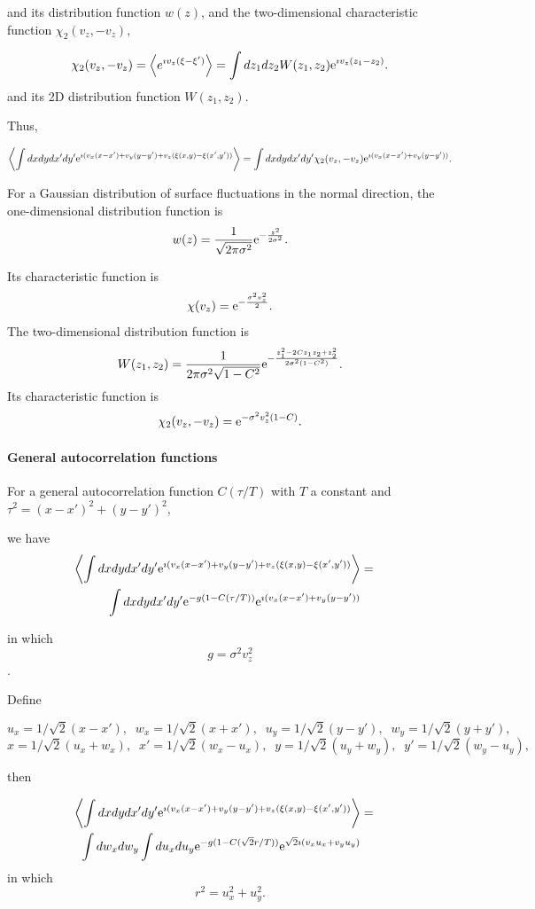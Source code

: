 \documentclass[11pt]{article}
\newcommand{\e}{{\rm e}}
\begin{document}
{{{{and its distribution function $w(z)$, and the two-dimensional characteristic function $\chi_{2}(v_{z}, -v_{z}),$

$$\chi_{2}(v_{z},-v_{z})=\left<e^{\imath v_{z}(\xi-\xi')}\right>=\int dz_{1} dz_{2} W(z_{1},z_{2}) \e^{\imath v_{z}(z_{1}-z_{2})}.$$
 and its 2D distribution function
 $W(z_{1},z_{2})$.
 
 Thus,
 
 $$\left<\int dx dydx'dy'\e^{\imath( v_{x}(x-x')+v_{y}(y-y')+v_{z}(\xi(x,y)-\xi(x',y'))}\right>=\int dx dydx'dy'\chi_{2}(v_{z},-v_{z})\e^{\imath( v_{x}(x-x')+v_{y}(y-y'))}.$$

 For a Gaussian distribution of surface fluctuations in the normal direction, the one-dimensional distribution function is
 $$w(z)=\frac{1}{\sqrt{2\pi\sigma^{2}}}\e^{-\frac{z^{2}}{2\sigma^{2}}}.$$
 
 Its characteristic function is
 $$\chi(v_{z})=\e^{-\frac{\sigma^{2}v_{z}^{2}}{2}}.$$
 The two-dimensional distribution function is
  $$W(z_{1},z_{2})=\frac{1}{2\pi\sigma^{2}\sqrt{1-C^{2}}}\e^{-\frac{z_{1}^{2}-2Cz_{1}z_{2}+z_{2}^{2}}{2\sigma^{2}(1-C^{2})}}.$$
  Its characteristic function is
 $$\chi_{2}(v_{z},-v_{z})=\e^{-\sigma^{2}v_{z}^{2}(1-C)}.$$
  \paragraph{General autocorrelation functions}

 For a general autocorrelation function $C(\tau/T)$
 with $T$ a constant and $\tau^{2}=(x-x')^{2}+(y-y')^{2},$
 
 we have
\begin{eqnarray}
\left<\int dx dydx'dy'\e^{\imath( v_{x}(x-x')+v_{y}(y-y')+v_{z}(\xi(x,y)-\xi(x',y'))}\right>&=&\\
\int dx dydx'dy'\e^{-g(1-C(\tau/T))}\e^{\imath( v_{x}(x-x')+v_{y}(y-y'))}\end{eqnarray}

in which
$$g=\sigma^{2}v_{z}^{2}$$.

Define

$$u_{x}=1/\sqrt{2}(x-x'),\;\;w_{x}=1/\sqrt{2}(x+x'),\;\;u_{y}=1/\sqrt{2}(y-y'),\;\;w_{y}=1/\sqrt{2}(y+y'),$$
$$x=1/\sqrt{2}(u_{x}+w_{x}),\;\;x'=1/\sqrt{2}(w_{x}-u_{x}),\;\;y=1/\sqrt{2}(u_{y}+w_{y}),\;\;y'=1/\sqrt{2}(w_{y}-u_{y}),$$

then

\begin{eqnarray}
\left<\int dx dydx'dy'\e^{\imath( v_{x}(x-x')+v_{y}(y-y')+v_{z}(\xi(x,y)-\xi(x',y'))}\right>&=&\\
\int dw_{x}dw_{y}\int du_{x} du_{y}\e^{-g(1-C(\sqrt{2}r/T))}\e^{\sqrt{2}\imath( v_{x}u_{x}+v_{y}u_{y})}\end{eqnarray}
 in which
 $$r^{2}=u_{x}^{2}+u_{y}^{2}.$$

}}}}
\end{document}
